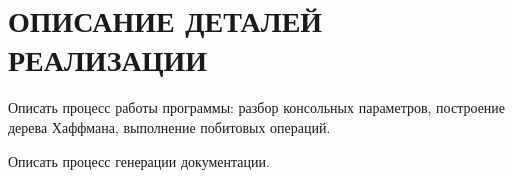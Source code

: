 \section[Описание деталей реализации]{ОПИСАНИЕ ДЕТАЛЕЙ РЕАЛИЗАЦИИ}
\label{sec:realization}

Описать процесс работы программы: 
разбор консольных параметров, построение дерева Хаффмана,
выполнение побитовых операций.

Описать процесс генерации документации.










